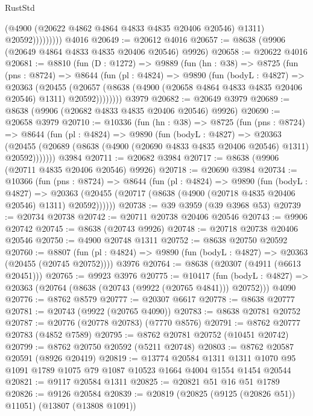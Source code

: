 \begin{lexlean}{RustStd}
\begin{coremodule}
                      (@4900 (@20622 @4862 @4864 @4833 @4835 @20406 @20546) @1311)
                      @20592)))))))))
    @4016
@20649 := @20612 @4016
@20657 := @8638 (@9906 (@20649 @4864 @4833 @4835 @20406 @20546) @9926)
@20658 := @20622 @4016
@20681 := @8810
    (fun (D : @1272) =>
    @9889
      (fun (hn : @38) =>
      @8725
        (fun (pns : @8724) =>
        @8644
          (fun (pl : @4824) =>
          @9890
            (fun (bodyL : @4827) =>
            @20363
              (@20455
                (@20657 (@8638 (@4900 (@20658 @4864 @4833 @4835 @20406 @20546) @1311) @20592))))))))
    @3979
@20682 := @20649 @3979
@20689 := @8638 (@9906 (@20682 @4833 @4835 @20406 @20546) @9926)
@20690 := @20658 @3979
@20710 := @10336
    (fun (hn : @38) =>
    @8725
      (fun (pns : @8724) =>
      @8644
        (fun (pl : @4824) =>
        @9890
          (fun (bodyL : @4827) =>
          @20363
            (@20455 (@20689 (@8638 (@4900 (@20690 @4833 @4835 @20406 @20546) @1311) @20592)))))))
    @3984
@20711 := @20682 @3984
@20717 := @8638 (@9906 (@20711 @4835 @20406 @20546) @9926)
@20718 := @20690 @3984
@20734 := @10366
    (fun (pns : @8724) =>
    @8644
      (fun (pl : @4824) =>
      @9890
        (fun (bodyL : @4827) =>
        @20363 (@20455 (@20717 (@8638 (@4900 (@20718 @4835 @20406 @20546) @1311) @20592))))))
@20738 := @39 @3959 (@39 @3968 @53)
@20739 := @20734 @20738
@20742 := @20711 @20738 @20406 @20546
@20743 := @9906 @20742
@20745 := @8638 (@20743 @9926)
@20748 := @20718 @20738 @20406 @20546
@20750 := @4900 @20748 @1311
@20752 := @8638 @20750 @20592
@20760 := @8807
    (fun (pl : @4824) => @9890 (fun (bodyL : @4827) => @20363 (@20455 (@20745 @20752))))
    @3976
@20764 := @8638 (@20307 (@4911 (@6613 @20451)))
@20765 := @9923 @3976
@20775 := @10417
    (fun (bodyL : @4827) => @20363 (@20764 (@8638 (@20743 (@9922 (@20765 @4841))) @20752)))
    @4090
@20776 := @8762 @8579
@20777 := @20307 @6617
@20778 := @8638 @20777
@20781 := @20743 (@9922 (@20765 @4090))
@20783 := @8638 @20781 @20752
@20787 := @20776 (@20778 @20783) (@7770 @8576)
@20791 := @8762 @20777 @20783 (@4852 @7589)
@20795 := @8762 @20781 @20752 (@10451 @20742)
@20799 := @8762 @20750 @20592 (@5211 @20748)
@20803 := @8762 @20587 @20591 (@8926 @20419)
@20819 := @13774
    @20584
    @1311
    @1311
    @1070
    @95
    @1091
    @1789
    @1075
    @79
    @1087
    @10523
    @1664
    @4004
    @1554
    @1454
    @20544
@20821 := @9117 @20584 @1311
@20825 := @20821 @51 @16 @51 @1789
@20826 := @9126 @20584
@20839 := @20819
    (@20825 (@9125 (@20826 @51)) @11051)
    (@13807 (@13808 @1091))

\end{coremodule}
\end{lexlean}
